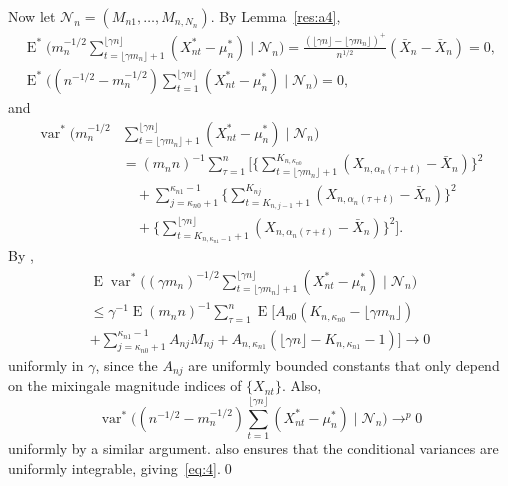 \documentclass[12pt]{article}
\theoremstyle{definition}
\DeclareMathOperator{\E}{E}
\DeclareMathOperator{\var}{var}
\begin{document}
Now let $\mathcal{N}_n = (M_{n1},\dots,M_{n,N_n})$.  By
Lemma~\ref{res:a4},
\begin{gather}\label{eq:17}
  \E^{*} \Big(m_n^{-1/2} \sum_{t=\lfloor \gamma m_n \rfloor +
    1}^{\lfloor \gamma n \rfloor} (X_{nt}^{*} - \mu_n^{*}) \;\Big|\;
  \mathcal{N}_n \Big) = \frac{(\lfloor \gamma n \rfloor - \lfloor
    \gamma m_n
    \rfloor)^{+}}{n^{1/2}} (\bar{X}_n - \bar{X}_n) = 0, \\
  \E^{*} \Big((n^{-1/2} - m_n^{-1/2}) \sum_{t=1}^{\lfloor \gamma n
    \rfloor} (X_{nt}^* - \mu_n^*) \;\Big|\; \mathcal{N}_n \Big) = 0,
\end{gather}
and
\begin{align}
  \var^{*} \Big(m_n^{-1/2} & \sum_{t=\lfloor \gamma m_n \rfloor +
    1}^{\lfloor \gamma n \rfloor} (X_{nt}^{*} - \mu_n^{*}) \;\Big|\;
  \mathcal{N}_n \Big) \\ &= (m_n n)^{-1} \sum_{\tau=1}^n \Bigg[
  \Bigg\{ \sum_{t= \lfloor \gamma m_n \rfloor + 1}^{K_{n,\kappa_{n0}}}
  (X_{n,\alpha_n(\tau + t)} - \bar{X}_n) \Bigg\}^2 \\&\quad +
  \sum_{j=\kappa_{n0} + 1}^{\kappa_{n1} - 1} \Bigg\{ \sum_{t=K_{n,j-1}
    + 1}^{K_{nj}} (X_{n, \alpha_n(\tau+t)} - \bar X_n)\Bigg\}^2
  \\&\quad + \Bigg\{ \sum_{t=K_{n,\kappa_{n1} - 1} + 1}^{\lfloor
    \gamma n \rfloor} (X_{n, \alpha_n(\tau + t)} - \bar{X}_n)\Bigg\}^2
  \Bigg].
\end{align}
By \citet[Theorem~1.6]{Mcl:75},
\begin{multline}
  \E \var^{*} \Big( (\gamma m_n)^{-1/2} \sum_{t=\lfloor \gamma m_n
    \rfloor + 1}^{\lfloor \gamma n \rfloor} (X_{nt}^* - \mu_n^*)
  \;\Big|\; \mathcal{N}_n\Big) \\ \leq \gamma^{-1} \E (m_{n} n)^{-1} \sum_{\tau=1}^n
  \E \Big[ A_{n0} (K_{n,\kappa_{n0}} - \lfloor \gamma m_n \rfloor) \\
  + \sum_{j=\kappa_{n0} + 1}^{\kappa_{n1} - 1} A_{nj} M_{nj} +
  A_{n,\kappa_{n1}} (\lfloor \gamma n \rfloor - K_{n,\kappa_{n1}} - 1)
  \Big] \to 0
\end{multline}
uniformly in $\gamma$, since the $A_{nj}$ are uniformly bounded
constants that only depend on the mixingale magnitude indices of
$\{X_{nt}\}$.  Also,
\begin{equation}
  \var^{*} \Big((n^{-1/2} - m_n^{-1/2})
  \sum_{t=1}^{\lfloor \gamma n \rfloor} (X_{nt}^* - \mu_n^*) \mid
  \mathcal{N}_n\Big) \to^p 0
\end{equation}
uniformly by a similar argument.  \citet[Theorem~1.6]{Mcl:75} also
ensures that the conditional variances are uniformly integrable,
giving~\eqref{eq:4}.\qed
\end{document}
